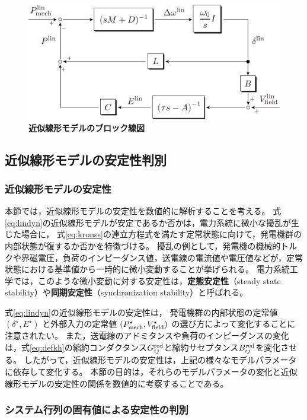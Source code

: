 \documentclass[tombow,dvipdfmx]{corona-a5-1.1}
\begin{document}
\begin{figure}[t]
\centering
\includegraphics[width = .8\linewidth]{figs/blocklinsys3}
\medskip
\caption{\textbf{近似線形モデルのブロック線図}}
\label{fig:blocklinsys}
\medskip
\end{figure}

\subsection{近似線形モデルの安定性判別}

\subsubsection{近似線形モデルの安定性}

本節では，近似線形モデルの安定性を数値的に解析することを考える。
式\ref{eq:lindyn}の近似線形モデルが安定であるか否かは，電力系統に微小な擾乱が生じた場合に，
式\ref{eq:kronss}の連立方程式を満たす定常状態に向けて，発電機群の内部状態が復するか否かを特徴づける。
擾乱の例として，発電機の機械的トルクや界磁電圧，負荷のインピーダンス値，送電線の電流値や電圧値などが，定常状態における基準値から一時的に微小変動することが挙げられる。
電力系統工学では，このような微小変動に対する安定性は，\textbf{定態安定性}（steady state stability）や\textbf{同期安定性}（synchronization stability）と呼ばれる。


式\ref{eq:lindyn}の近似線形モデルの安定性は，
発電機群の内部状態の定常値
$(\delta^{\star},E^{\star})$
と外部入力の定常値
$(P_{{\rm mech}}^{\star},V_{{\rm field}}^{\star})$
の選び方によって変化することに注意されたい。
また，送電線のアドミタンスや負荷のインピーダンスの変化は，式\ref{eq:defkh}の縮約コンダクタンス$G^{\rm red}_{ij}$と縮約サセプタンス$B^{\rm red}_{ij}$を変化させる。
したがって，近似線形モデルの安定性は，上記の様々なモデルパラメータに依存して変化する。
本節の目的は，それらのモデルパラメータの変化と近似線形モデルの安定性の関係を数値的に考察することである。

\subsubsection{システム行列の固有値による安定性の判別}
\end{document}

